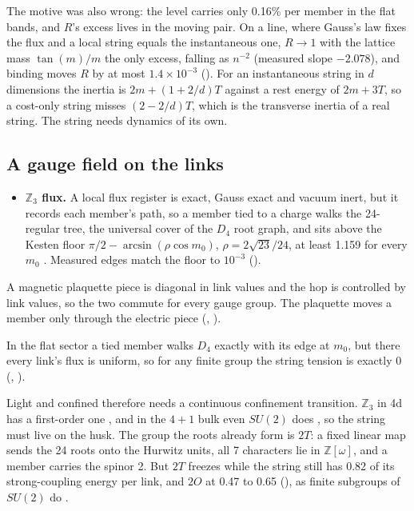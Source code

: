 The motive was also wrong: the level carries only 0.16\% per member in the flat bands, and $R$'s excess lives in the
moving pair. On a line, where Gauss's law fixes the flux and a local string equals the instantaneous one, $R \to 1$ with
the lattice mass $\tan(m)/m$ the only excess, falling as $n^{-2}$ (measured slope $-2.078$), and binding moves $R$ by at
most $1.4 \times 10^{-3}$ (). For an instantaneous string in $d$ dimensions the inertia is
$2m + (1 + 2/d)T$ against a rest energy of $2m + 3T$, so a cost-only string misses $(2 - 2/d)T$, which is the
transverse inertia of a real string. The string needs dynamics of its own.

\subsection{A gauge field on the links}

\begin{itemize}
\item \textbf{$\mathbb{Z}_3$ flux.} A local flux register is exact, Gauss exact and vacuum inert, but it records each
member's path, so a member tied to a charge walks the 24-regular tree, the universal cover of the $D_4$ root graph, and
sits above the Kesten floor $\pi/2 - \arcsin(\rho \cos m_0)$, $\rho = 2\sqrt{23}/24$, at least 1.159 for every $m_0$
\cite{kesten1959}. Measured edges match the floor to $10^{-3}$ ().
\end{itemize}

\begin{theorem}[A]
A magnetic plaquette piece is diagonal in link values and the hop is controlled by link values, so the two commute for
every gauge group. The plaquette moves a member only through the electric piece (,
).
\end{theorem}

\begin{theorem}[B]
In the flat sector a tied member walks $D_4$ exactly with its edge at $m_0$, but there every link's flux is uniform, so
for any finite group the string tension is exactly 0 (, ).
\end{theorem}

Light and confined therefore needs a continuous confinement transition. $\mathbb{Z}_3$ in 4d has a first-order one
\cite{creutz1979}, and in the $4+1$ bulk even $SU(2)$ does \cite{creutz1979su2}, so the string must live on the husk.
The group the roots already form is $2T$: a fixed linear map sends the 24 roots onto the Hurwitz units, all 7
characters lie in $\mathbb{Z}[\omega]$, and a member carries the spinor 2. But $2T$ freezes while the string still has
0.82 of its strong-coupling energy per link, and $2O$ at 0.47 to 0.65 (), as finite subgroups of
$SU(2)$ do \cite{petcher1980, bhanot1981}.

